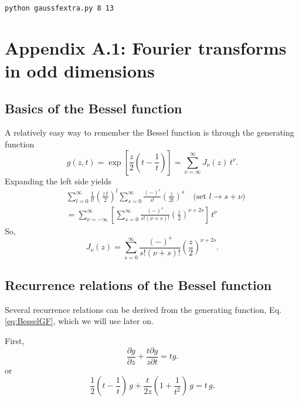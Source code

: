 \documentclass[preprint]{revtex4-1}
\numberwithin{equation}{subsection}
\numberwithin{table}{section}
\begin{document}
\qquad\texttt{python gaussfextra.py 8 13}



\section{Appendix A.1: Fourier transforms in odd dimensions}



\subsection{Basics of the Bessel function}



A relatively easy way to remember the Bessel function
is through the generating function
%
\begin{equation}
  g(z, t)
  =
  \exp\left[ \frac{z}{2} \left(t - \frac{1}{t}\right) \right]
  =
  \sum_{\nu = \infty}^\infty J_\nu(z) \, t^\nu.
  \label{eq:BesselGF}
\end{equation}
%
Expanding the left side yields
\begin{align*}
&
  \sum_{l = 0}^\infty \frac{ 1 } { l! } \left( \frac {z \, t} 2\right)^l
  \sum_{s = 0}^\infty \frac{ (-)^s } { s! }
    \left( \frac z {2t} \right)^s
  \quad \mbox{(set $l \rightarrow s + \nu$)} \\
&=
  \sum_{\nu = -\infty}^\infty
  \left[
  \sum_{s = 0}^\infty
  \frac { (-)^s } {s! (\nu + s)! }
  \left( \frac z 2 \right)^{\nu + 2s}
  \right]
  \, t^\nu
\end{align*}
So,
\begin{equation}
  J_\nu(z)
=
  \sum_{s = 0}^\infty
  \frac{ (-)^s } { s! (\nu + s)! }
  \left( \frac z 2 \right)^{\nu + 2s}.
  \label{eq:bessel}
\end{equation}



\subsection{Recurrence relations of the Bessel function}

Several recurrence relations can be derived from the generating function,
Eq. \eqref{eq:BesselGF}, which we will use later on.

First,
\begin{equation}
  \frac { \partial g } { \partial z}
+
  \frac { t \partial g } { z \partial t}
=
  t g.
  \label{eq:BesselR1g}
\end{equation}
or
\[
\frac 1 2 \left( t - \frac 1 t \right) \, g
+
\frac {t} {2 z} \left( 1 + \frac 1 { t^2 } \right) \, g
=
  t \, g.
\]
\end{document}
